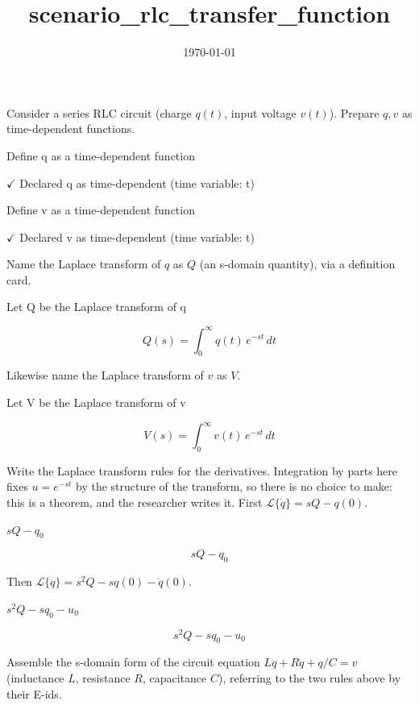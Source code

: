 \documentclass[dvipdfmx]{article}
\title{scenario\_rlc\_transfer\_function}
\date{\today}
\begin{document}
\maketitle

Consider a series RLC circuit (charge $q(t)$, input voltage $v(t)$). Prepare $q,v$ as time-dependent functions.

Define q as a time-dependent function

$\checkmark$ Declared q as time-dependent (time variable: t)

Define v as a time-dependent function

$\checkmark$ Declared v as time-dependent (time variable: t)

Name the Laplace transform of $q$ as $Q$ (an s-domain quantity), via a definition card.

Let Q be the Laplace transform of q

\begin{equation}
  Q(s) = \int_0^{\infty} q(t)\, e^{-s t}\, dt
  \label{eq:E1}
\end{equation}

Likewise name the Laplace transform of $v$ as $V$.

Let V be the Laplace transform of v

\begin{equation}
  V(s) = \int_0^{\infty} v(t)\, e^{-s t}\, dt
  \label{eq:E2}
\end{equation}

Write the Laplace transform rules for the derivatives. Integration by parts here fixes $u=e^{-st}$ by the structure of the transform, so there is no choice to make: this is a theorem, and the researcher writes it. First $\mathcal L\{\dot q\} = sQ - q(0)$.

$s Q - q_0$

\begin{equation}
  s Q - q_0
  \label{eq:E3}
\end{equation}

Then $\mathcal L\{\ddot q\} = s^2 Q - s q(0) - \dot q(0)$.

$s^2 Q - s q_0 - u_0$

\begin{equation}
  s^2 Q - s q_0 - u_0
  \label{eq:E4}
\end{equation}

Assemble the s-domain form of the circuit equation $L\ddot q+R\dot q+q/C=v$ (inductance $L$, resistance $R$, capacitance $C$), referring to the two rules above by their E-ids.
\end{document}
